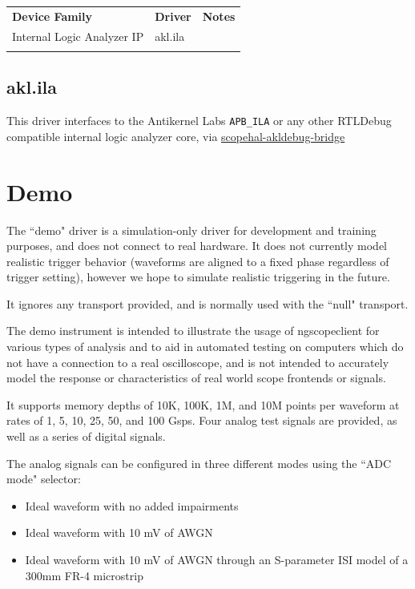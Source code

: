 \begin{tabularx}{16cm}{llX}
\thickhline
\textbf{Device Family} & \textbf{Driver} & \textbf{Notes} \\
\thickhline
Internal Logic Analyzer IP & akl.ila & \\
\thickhline
\end{tabularx}

\subsection{akl.ila}

This driver interfaces to the Antikernel Labs \verb|APB_ILA| or any other RTLDebug compatible internal logic analyzer core, via \href{https://github.com/ngscopeclient/scopehal-akldebug-bridge}{scopehal-akldebug-bridge}

\section{Demo}

The ``demo" driver is a simulation-only driver for development and training purposes, and does not connect to real
hardware. It does not currently model realistic trigger behavior (waveforms are aligned to a fixed phase regardless of
trigger setting), however we hope to simulate realistic triggering in the future.

It ignores any transport provided, and is normally used with the ``null" transport.

The demo instrument is intended to illustrate the usage of ngscopeclient for various types of analysis and to aid in
automated testing on computers which do not have a connection to a real oscilloscope, and is not intended to accurately
model the response or characteristics of real world scope frontends or signals.

It supports memory depths of 10K, 100K, 1M, and 10M points per waveform at rates of 1, 5, 10, 25, 50, and 100 Gsps.
Four analog test signals are provided, as well as a series of digital signals.

The analog signals can be configured in three different modes using the ``ADC mode" selector:
\begin{itemize}
\item Ideal waveform with no added impairments
\item Ideal waveform with 10 mV of AWGN
\item Ideal waveform with 10 mV of AWGN through an S-parameter ISI model of a 300mm FR-4 microstrip
\end{itemize}

